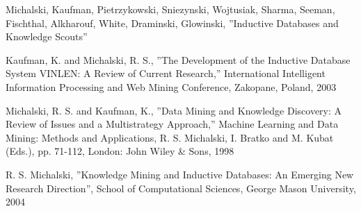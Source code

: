 \begin{thebibliography}{99}
 {Michalski, Kaufman, Pietrzykowski, Sniezynski,
    Wojtusiak, Sharma, Seeman, Fischthal, Alkharouf, White, Draminski,
    Glowinski, ''Inductive Databases and Knowledge Scouts''}

 {Kaufman, K. and Michalski, R. S., ''The Development
    of the Inductive Database System VINLEN: A Review of Current
    Research,'' International Intelligent Information Processing and
    Web Mining Conference, Zakopane, Poland, 2003}

 {Michalski, R. S. and Kaufman, K., ''Data Mining and
    Knowledge Discovery: A Review of Issues and a Multistrategy
    Approach,'' Machine Learning and Data Mining: Methods and
    Applications, R. S. Michalski, I. Bratko and M.  Kubat (Eds.), pp.
    71-112, London: John Wiley \& Sons, 1998}

 {R. S. Michalski, ''Knowledge Mining and Inductive
    Databases: An Emerging New Research Direction'', School of
    Computational Sciences, George Mason University, 2004}
\end{thebibliography}